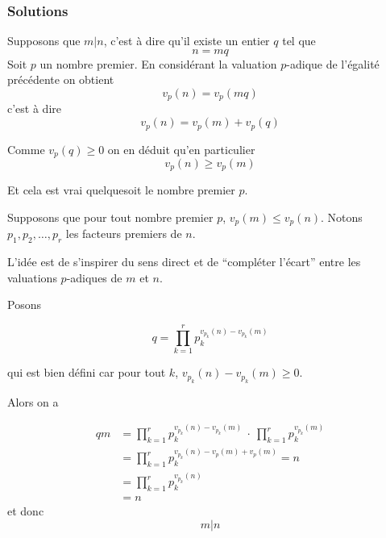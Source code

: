 



\subsubsection{Solutions}


\begin{sol}
\framebox{$\Rightarrow$} Supposons que $m | n$, c'est à dire qu'il existe un entier $q$ tel que
$$n = m q$$
Soit $p$ un nombre premier. En considérant la valuation $p$-adique de l'égalité précédente on obtient
$$v_p(n) = v_p(m q)$$
c'est à dire
$$v_p(n) = v_p(m) + v_p( q)$$

Comme $v_p(q) \ge 0$ on en déduit qu'en particulier
$$v_p(n) \ge v_p(m)$$

Et cela est vrai quelquesoit le nombre premier $p$.

\framebox{$\Leftarrow$} Supposons que pour tout nombre premier $p$,
$v_p(m) \le v_p(n)$. Notons $p_1, p_2, \ldots, p_r$ les facteurs premiers de $n$.

L'idée est de s'inspirer du sens direct et de ``compléter l'écart'' entre les valuations $p$-adiques de $m$ et $n$.

Posons

$$q = \prod_{k = 1}^r p_k^{v_{p_k}(n)-v_{p_k}(m)}$$

qui est bien défini car pour tout $k$, $v_{p_k}(n)-v_{p_k}(m) \ge 0$.

Alors on a

$$\begin{aligned}
        q m & = \prod_{k = 1}^r p_k^{v_{p_k}(n)-v_{p_k}(m)} ~ \cdot ~\prod_{k = 1}^r p_k^{v_{p_k}(m)} \\
            & = \prod_{k = 1}^r p_k^{v_{p_k}(n)-v_p(m) + v_p(m)} = n                                   \\
            & = \prod_{k = 1}^r p_k^{v_{p_k}(n)}                                                     \\
            & = n
    \end{aligned}$$
et donc
$$m | n$$
\end{sol}


